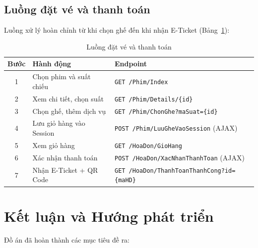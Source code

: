 \documentclass[12pt,a4paper,oneside]{book}
\theoremstyle{plain}
\numberwithin{equation}{chapter}
\begin{document}
\section{Luồng đặt vé và thanh toán}\label{Sec4.6}

\noindent Luồng xử lý hoàn chỉnh từ khi chọn ghế đến khi nhận E-Ticket (Bảng~\ref{table_flow}):

\begin{table}[H]
    \begin{center}
        \begin{tabular}{|c|l|l|}
            \hline
            \textbf{Bước} & \textbf{Hành động} & \textbf{Endpoint} \\
            \hline
            1 & Chọn phim và suất chiếu    & \texttt{GET /Phim/Index} \\
            \hline
            2 & Xem chi tiết, chọn suất   & \texttt{GET /Phim/Details/\{id\}} \\
            \hline
            3 & Chọn ghế, thêm dịch vụ    & \texttt{GET /Phim/ChonGhe?maSuat=\{id\}} \\
            \hline
            4 & Lưu giỏ hàng vào Session  & \texttt{POST /Phim/LuuGheVaoSession} (AJAX) \\
            \hline
            5 & Xem giỏ hàng              & \texttt{GET /HoaDon/GioHang} \\
            \hline
            6 & Xác nhận thanh toán       & \texttt{POST /HoaDon/XacNhanThanhToan} (AJAX) \\
            \hline
            7 & Nhận E-Ticket + QR Code   & \texttt{GET /HoaDon/ThanhToanThanhCong?id=\{maHD\}} \\
            \hline
        \end{tabular}
    \end{center}
    \caption{Luồng đặt vé và thanh toán}\label{table_flow}
\end{table}

\chapter{Kết luận và Hướng phát triển}

\noindent Đồ án đã hoàn thành các mục tiêu đề ra:
\end{document}
